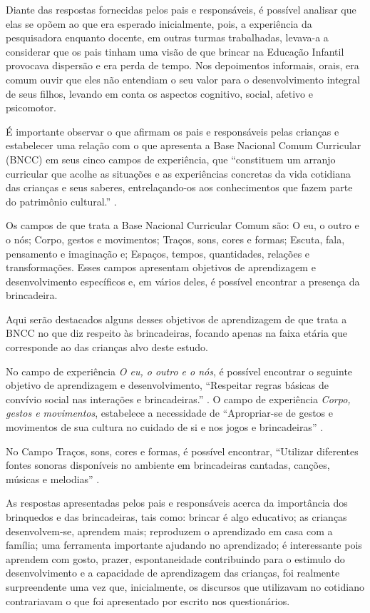 \begin{refsection}
    Diante das respostas fornecidas pelos pais e responsáveis, é possível analisar que elas se opõem ao que era esperado inicialmente, pois, a experiência da pesquisadora enquanto docente, em outras turmas trabalhadas, levava-a a considerar que os pais tinham uma visão de que brincar na Educação Infantil provocava dispersão e era perda de tempo. Nos depoimentos informais, orais, era comum ouvir que eles não entendiam o seu valor para o desenvolvimento integral de seus filhos, levando em conta os aspectos cognitivo, social, afetivo e psicomotor. 

    É importante observar o que afirmam os pais e responsáveis pelas crianças e estabelecer uma relação com o que apresenta a Base Nacional Comum Curricular (BNCC) em seus cinco campos de experiência, que “constituem um arranjo curricular que acolhe as situações e as experiências concretas da vida cotidiana das crianças e seus saberes, entrelaçando-os aos conhecimentos que fazem parte do patrimônio cultural.” \cite[p.~38]{BaNacCurEF2017}. 

    Os campos de que trata a Base Nacional Curricular Comum são: O eu, o outro e o nós; Corpo, gestos e movimentos; Traços, sons, cores e formas; Escuta, fala, pensamento e imaginação e; Espaços, tempos, quantidades, relações e transformações. Esses campos apresentam objetivos de aprendizagem e desenvolvimento específicos e, em vários deles, é possível encontrar a presença da brincadeira. 

    Aqui serão destacados alguns desses objetivos de aprendizagem de que trata a BNCC no que diz respeito às brincadeiras, focando apenas na faixa etária que corresponde ao das crianças alvo deste estudo.  

    No campo de experiência \textit{O eu, o outro e o nós}, é possível encontrar o seguinte objetivo de aprendizagem e desenvolvimento, “Respeitar regras básicas de convívio social nas interações e brincadeiras.” \cite[p.~44]{BaNacCurEF2017}. O campo de experiência \textit{Corpo, gestos e movimentos}, estabelece a necessidade de “Apropriar-se de gestos e movimentos de sua cultura no cuidado de si e nos jogos e brincadeiras” \cite[p.~45]{BaNacCurEF2017}.  

    No Campo Traços, sons, cores e formas, é possível encontrar, “Utilizar diferentes fontes sonoras disponíveis no ambiente em brincadeiras cantadas, canções, músicas e melodias” \cite[p.~46]{BaNacCurEF2017}.

    As respostas apresentadas pelos pais e responsáveis acerca da importância dos brinquedos e das brincadeiras, tais como: brincar é algo educativo; as crianças desenvolvem-se, aprendem mais; reproduzem o aprendizado em casa com a família; uma ferramenta importante ajudando no aprendizado; é interessante pois aprendem com gosto, prazer, espontaneidade contribuindo para o estimulo do desenvolvimento e a capacidade de aprendizagem das crianças, foi realmente surpreendente uma vez que, inicialmente, os discursos que utilizavam no cotidiano contrariavam o que foi apresentado por escrito nos questionários. 


\end{refsection}
